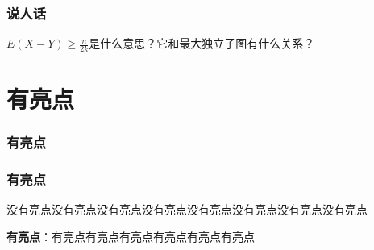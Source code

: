 \documentclass[AutoFakeBold]{beamer}
\begin{document}
{    \begin{frame}
        \frametitle{说人话}
        \(E(X-Y)\geq \frac{n}{2k}\)是什么意思？它和最大独立子图有什么关系？
        \begin{figure}
        \end{figure}
    
    \end{frame}
    
    \section{有亮点}

    \begin{frame}
        \frametitle{有亮点}
    
        
    
    \end{frame}

    \begin{frame}
        \frametitle{有亮点}
    
        没有亮点没有亮点没有亮点没有亮点没有亮点没有亮点没有亮点没有亮点

        \textbf{有亮点}：有亮点有亮点有亮点有亮点有亮点有亮点


\end{frame}}
\end{document}
